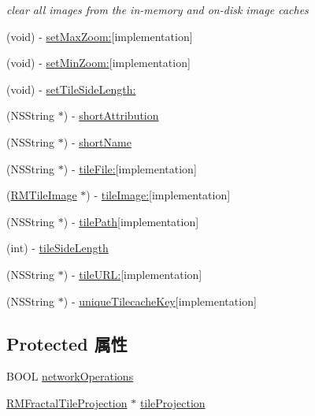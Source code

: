 \begin{DoxyCompactItemize}
\begin{DoxyCompactList}\small\item\em clear all images from the in-\/memory and on-\/disk image caches \end{DoxyCompactList}\item 
(void) -\/ \hyperlink{interface_r_m_abstract_mercator_web_source_a3b6433a48a63999eb62cb3db63185d9c}{set\-Max\-Zoom\-:}{\ttfamily  \mbox{[}implementation\mbox{]}}
\item 
(void) -\/ \hyperlink{interface_r_m_abstract_mercator_web_source_ab30d98690abe95929a63f338635a898f}{set\-Min\-Zoom\-:}{\ttfamily  \mbox{[}implementation\mbox{]}}
\item 
(void) -\/ \hyperlink{interface_r_m_abstract_mercator_web_source_ad7f57c2c9ee2c43e1877195b56ac68f2}{set\-Tile\-Side\-Length\-:}
\item 
(N\-S\-String $\ast$) -\/ \hyperlink{interface_r_m_abstract_mercator_web_source_a6be24cea169d058b5eefd7572bedc366}{short\-Attribution}
\item 
(N\-S\-String $\ast$) -\/ \hyperlink{interface_r_m_abstract_mercator_web_source_a3e6c6ef18250ce14317373db9df1fc85}{short\-Name}
\item 
(N\-S\-String $\ast$) -\/ \hyperlink{interface_r_m_abstract_mercator_web_source_a5883e8ad44e66039acaa12c715a05154}{tile\-File\-:}{\ttfamily  \mbox{[}implementation\mbox{]}}
\item 
(\hyperlink{interface_r_m_tile_image}{R\-M\-Tile\-Image} $\ast$) -\/ \hyperlink{interface_r_m_abstract_mercator_web_source_a14e580ef6a285f9feedb8028a50b2b63}{tile\-Image\-:}{\ttfamily  \mbox{[}implementation\mbox{]}}
\item 
(N\-S\-String $\ast$) -\/ \hyperlink{interface_r_m_abstract_mercator_web_source_a00079a441d15a29bf5181e3672e9ba62}{tile\-Path}{\ttfamily  \mbox{[}implementation\mbox{]}}
\item 
(int) -\/ \hyperlink{interface_r_m_abstract_mercator_web_source_ae98cbd18cae13443ec8e71f7c850615b}{tile\-Side\-Length}
\item 
(N\-S\-String $\ast$) -\/ \hyperlink{interface_r_m_abstract_mercator_web_source_aba0294fce2e720adc6bf91180a90b28e}{tile\-U\-R\-L\-:}{\ttfamily  \mbox{[}implementation\mbox{]}}
\item 
(N\-S\-String $\ast$) -\/ \hyperlink{interface_r_m_abstract_mercator_web_source_acf45b84d8f39ef7fcc2a92a2e320a9a2}{unique\-Tilecache\-Key}{\ttfamily  \mbox{[}implementation\mbox{]}}
\end{DoxyCompactItemize}
\subsection*{Protected 属性}
\begin{DoxyCompactItemize}
\item 
B\-O\-O\-L \hyperlink{interface_r_m_abstract_mercator_web_source_ac05e057c8f0e7dc24790b673e136ce75}{network\-Operations}
\item 
\hyperlink{interface_r_m_fractal_tile_projection}{R\-M\-Fractal\-Tile\-Projection} $\ast$ \hyperlink{interface_r_m_abstract_mercator_web_source_abdb12e5197d9fb938a9d68bb0a9c9ae5}{tile\-Projection}
\end{DoxyCompactItemize}


